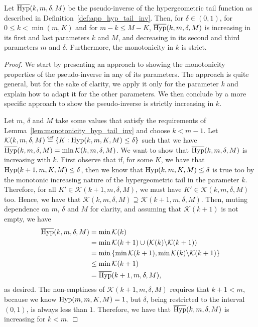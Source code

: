 \documentclass[twoside,11pt]{article}
\newcommand{\pr}[1]{\left(#1\right)}
\newcommand{\cb}[1]{\left\{#1\right\}}
\newcommand{\K}{\mathcal{K}}
\newcommand{\eqdef}{\overset{\smash{\mbox{\tiny \rm def}}}{=}}
\newcommand{\Hyp}{\textnormal{Hyp}}
\newcommand{\HypInv}{\overline{\textnormal{Hyp}}}
\begin{document}
\begin{lemma}\label{lem:monotonicity_hyp_tail_inv}

Let $\HypInv(k,m,\delta,M)$ be the pseudo-inverse of the hypergeometric tail function as described in Definition~\ref{def:app_hyp_tail_inv}.
Then, for $\delta\in (0,1)$, for $0 \le k < \min(m,K)$ and for $m-k \le M-K$, $\HypInv(k,m,\delta,M)$ is increasing in its first and last parameters $k$ and $M$, and decreasing in its second and third parameters $m$ and $\delta$.
Furthermore, the monotonicity in $k$ is strict.
\end{lemma}

\begin{proof}
We start by presenting an approach to showing the monotonicity properties of the pseudo-inverse in any of its parameters.
The approach is quite general, but for the sake of clarity, we apply it only for the parameter $k$ and explain how to adapt it for the other parameters.
We then conclude by a more specific approach to show the pseudo-inverse is strictly increasing in $k$.

Let $m$, $\delta$ and $M$ take some values that satisfy the requirements of Lemma~\ref{lem:monotonicity_hyp_tail_inv} and choose $k<m-1$.
Let $\K(k,m,\delta,M) \eqdef \cb{ K : \Hyp(k,m,K,M) \le \delta }$ such that we have $\HypInv(k,m,\delta,M) = \min \K(k,m,\delta,M)$.
We want to show that $\HypInv(k,m,\delta,M)$ is increasing with $k$.
First observe that if, for some $K$, we have that $\Hyp(k+1,m,K,M) \le \delta$, then we know that $\Hyp(k,m,K,M) \le \delta$ is true too by the monotonic increasing nature of the hypergeometric tail in the parameter $k$.
Therefore, for all $K' \in \K(k+1,m,\delta,M)$, we must have $K' \in \K(k,m,\delta,M)$ too.
Hence, we have that $\K(k,m,\delta,M) \supseteq \K(k+1,m,\delta,M)$.
Then, muting dependence on $m$, $\delta$ and $M$ for clarity, and assuming that $\K(k+1)$ is not empty, we have
\begin{align*}
\HypInv(k,m,\delta,M) 
    &= \min \K(k)\\
    &= \min \K(k+1) \cup \pr{ \K(k)\backslash \K(k+1)}\\
    &= \min \cb{ \min \K(k+1), \min \K(k)\backslash \K(k+1) }\\
    &\le \min \K(k+1)\\
    &= \HypInv(k+1,m,\delta,M),
\end{align*}
as desired.
The non-emptiness of $\K(k+1,m,\delta,M)$ requires that $k+1 < m$, because we know $\Hyp(m,m,K,M)=1$, but $\delta$, being restricted to the interval $(0,1)$, is always less than $1$.
Therefore, we have that $\HypInv(k,m,\delta,M)$ is increasing for $k < m$.


\end{proof}
\end{document}
